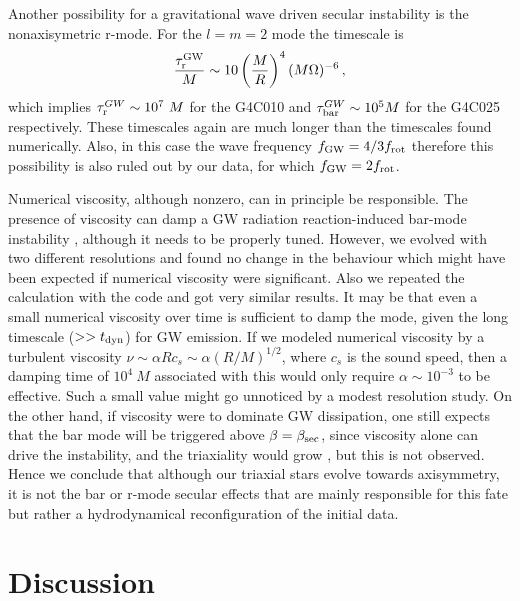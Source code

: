 \documentclass[twocolumn,superscriptaddress,showpacs,prd,aps,amsmath,amssymb,nofootinbib]{revtex4-1}
\newcommand{\GA}{\alpha}
\newcommand{\GB}{\beta}
\newcommand{\GT}{\tau}
\newcommand{\be}{\begin{equation}}
\newcommand{\ee}{\end{equation}}
\begin{document}

Another possibility for a gravitational wave driven secular instability is the 
nonaxisymetric r-mode. For the $l=m=2$ mode the timescale is \cite{LOM98}
\be
\frac{\GT_{\rm r}^{\rm GW}}{M}\sim 10\left(\frac{M}{R}\right)^4(M\Omega)^{-6} \, ,
\label{eq:GWrmode}
\ee
which implies $\GT_{\rm r}^{GW} \sim 10^7\ M$ for the G4C010 and $\GT_{\rm bar}^{GW} \sim 10^5 M$ for the G4C025
respectively. These timescales  again are much longer than the timescales found numerically. 
Also, in this case the wave frequency $f_{\rm GW}=4/3 f_{\rm rot}$
therefore this possibility is also ruled out by our data, for which $f_{\rm GW}=2 f_{\rm rot}$.

Numerical viscosity, although nonzero, can in principle be
responsible. The presence of viscosity can damp a GW radiation
reaction-induced bar-mode instability \cite{LD77}, although it needs
to be properly tuned. However, we evolved with two different
resolutions and found no change in the behaviour which might have been
expected if numerical viscosity were significant.  Also we repeated
the calculation with the \whisky{} code \cite{Betal05, GR07, DAPRG13,
  RRG14} and got very similar results.  It may be that even a small
numerical viscosity over time is sufficient to damp the mode, given
the long timescale ($>> t_{\rm dyn}$) for GW emission. If we modeled
numerical viscosity by a turbulent viscosity $\nu\sim \GA R c_s\sim
\GA (R/M)^{1/2}$, where $c_s$ is the sound speed, then a damping time
of $10^4\ M$ associated with this would only require $\GA\sim 10^{-3}$
to be effective. Such a small value might go unnoticed by a modest
resolution study.  On the other hand, if viscosity were to dominate GW
dissipation, one still expects that the bar mode will be triggered
above $\GB=\GB_{\rm sec}$, since viscosity alone can drive the
instability, and the triaxiality would grow \cite{Shapiro04}, but
this is not observed.  Hence we conclude that although our triaxial
stars evolve towards axisymmetry, it is not the bar or r-mode secular
effects that are mainly responsible for this fate but rather a
hydrodynamical reconfiguration of the initial data. 




\section{Discussion}
\end{document}
